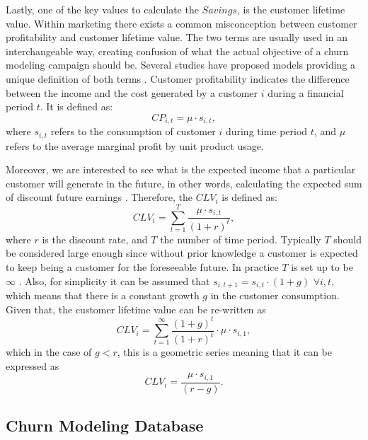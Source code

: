Lastly, one of the key values to calculate the $Savings$, is the customer lifetime value. Within 
marketing there exists a common misconception between customer profitability and customer lifetime 
value. The two terms are usually used in an interchangeable way, 
creating confusion of what the actual objective of a churn modeling campaign should be. Several 
studies have proposed models providing a unique definition of both terms 
\citep{Neslin2006,Pfeifer2004,Milne1999a,VanRaaij2003}. Customer 
profitability indicates the difference between the income and the cost 
generated by a customer $i$ during a financial period $t$. It is defined as: 
\begin{equation}
	CP_{i,t} = \mu  \cdot s_{i,t},
\end{equation}
where  $s_{i,t}$ refers to the consumption of customer $i$ during time period $t$, and $\mu$ refers 
to the average marginal profit by unit product usage.  

Moreover, we are interested to see what is the expected income that a particular customer will 
generate in the future, in other words, calculating the expected sum of 
discount future earnings \citep{Neslin2006}. Therefore, the $CLV_i$ is defined as:
\begin{equation}
	CLV_i = \sum_{t=1}^T\frac{\mu \cdot s_{i,t}}{(1+r)^t},
\end{equation}
where $r$ is the discount rate, and $T$ the number of time period.
Typically $T$ should be considered large enough since without prior 
knowledge a customer is expected to keep being a customer for the foreseeable future. In practice 
$T$ is set up to be $\infty$ \citep{Glady2009}. Also, for simplicity it can be assumed that 
$s_{i,t+1}=s_{i,t}\cdot (1+g)$ $\forall {i,t}$, which means that there is a constant growth $g$ in 
the customer consumption. Given that, the customer lifetime value can be re-written as
\begin{equation}
 CLV_i = \sum_{t=1}^\infty\frac{ (1+g)^t}{(1+r)^t}\cdot \mu\cdot s_{i,1},
\end{equation}
which in the case of $g<r$, this is a geometric series meaning that it can be expressed as
\begin{equation}
 CLV_i = \frac{\mu\cdot s_{i,1}}{(r-g)}.
\end{equation}


\subsection{Churn Modeling Database}
\label{sec:4:1:data}

